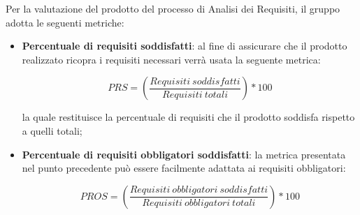 Per la valutazione del prodotto del processo di Analisi dei Requisiti, il gruppo adotta le seguenti metriche:
\begin{itemize}
	\item \textbf{Percentuale di requisiti soddisfatti}: al fine di assicurare che il prodotto realizzato ricopra i requisiti necessari verrà usata la seguente metrica:
\begin{center}
\[PRS = \left(\frac{Requisiti\ soddisfatti}{Requisiti\ totali}\right)*100\]
\end{center}
la quale restituisce la percentuale di requisiti che il prodotto soddisfa rispetto a quelli totali;

	\item \textbf{Percentuale di requisiti obbligatori soddisfatti}: la metrica presentata nel punto precedente può essere facilmente adattata ai requisiti obbligatori:
\begin{center}
\[PROS=\left(\frac{Requisiti\ obbligatori\ soddisfatti}{Requisiti\ obbligatori\ totali}\right)*100\]
\end{center}
\end{itemize}


